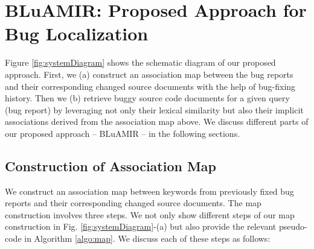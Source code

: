 \documentclass[conference]{IEEEtran}
\begin{document}
\section{BLuAMIR: Proposed Approach for Bug Localization} \label{sec:proposedmethod} 
Figure \ref{fig:systemDiagram} shows the schematic diagram of our proposed approach.
First, we (a) construct an association map between the bug reports and their corresponding changed source documents with the help of bug-fixing history.
Then we (b) retrieve buggy source code documents for a given query (bug report) by leveraging not only their lexical similarity but also their implicit associations derived from the association map above.   
We discuss different parts of our proposed approach -- BLuAMIR -- in the following sections.

\subsection{Construction of Association Map}\label{sec:MapConstruction}
We construct an association map between keywords from previously fixed bug reports and their corresponding changed source documents.
The map construction involves three steps.
We not only show different steps of our map construction in Fig. \ref{fig:systemDiagram}-(a) but also provide the relevant pseudo-code in  Algorithm \ref{algo:map}. We discuss each of these steps as follows:

\end{document}
